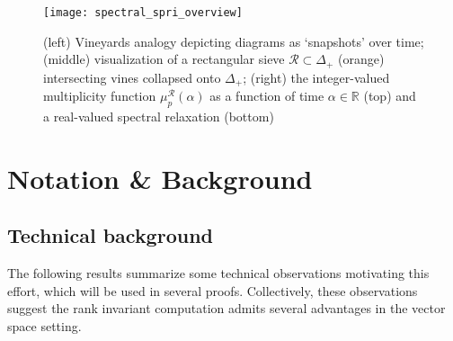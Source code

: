 \documentclass[10pt]{article}
\numberwithin{equation}{section}
\newcommand{\+}{%
	\raisebox{0.18ex}{\scaleobj{0.55}{+}}
}
\theoremstyle{definition}
\theoremstyle{definition}
\begin{document}

\begin{figure}\label{fig:overview}
\centering
\texttt{[image: spectral\_spri\_overview]}	
\caption{ (left) Vineyards analogy depicting diagrams as `snapshots' over time; (middle) visualization of a rectangular sieve $\mathcal{R} \subset \Delta_+$ (orange) intersecting vines collapsed onto $\Delta_+$; 
(right) the integer-valued multiplicity function $\mu_p^{\mathcal{R}}(\alpha)$ 
as a function of time $\alpha \in \mathbb{R}$ (top) and a real-valued spectral relaxation (bottom)
}
\end{figure}





\section{Notation \& Background}\label{sec:background_notation}


\subsection{Technical background}\label{sec:betti_derivation}

The following results summarize some technical observations motivating this effort, which will be used in several proofs. Collectively, these observations suggest the rank invariant computation admits several advantages in the vector space setting. 
\end{document}
